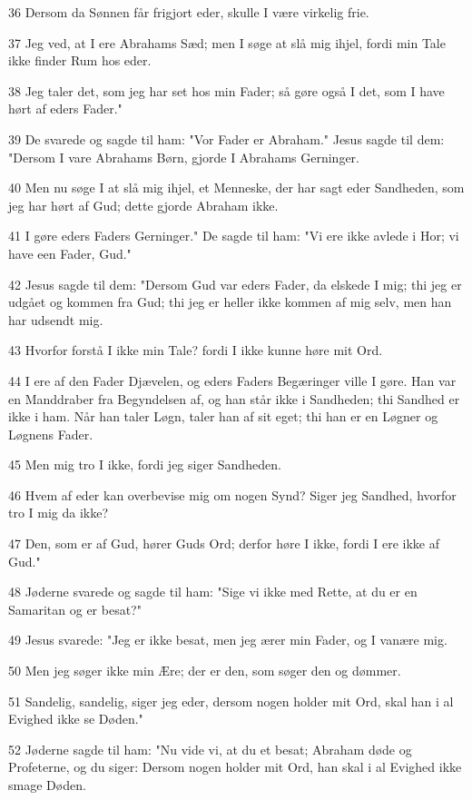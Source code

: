 \par 36 Dersom da Sønnen får frigjort eder, skulle I være virkelig frie.
\par 37 Jeg ved, at I ere Abrahams Sæd; men I søge at slå mig ihjel, fordi min Tale ikke finder Rum hos eder.
\par 38 Jeg taler det, som jeg har set hos min Fader; så gøre også I det, som I have hørt af eders Fader."
\par 39 De svarede og sagde til ham: "Vor Fader er Abraham." Jesus sagde til dem: "Dersom I vare Abrahams Børn, gjorde I Abrahams Gerninger.
\par 40 Men nu søge I at slå mig ihjel, et Menneske, der har sagt eder Sandheden, som jeg har hørt af Gud; dette gjorde Abraham ikke.
\par 41 I gøre eders Faders Gerninger." De sagde til ham: "Vi ere ikke avlede i Hor; vi have een Fader, Gud."
\par 42 Jesus sagde til dem: "Dersom Gud var eders Fader, da elskede I mig; thi jeg er udgået og kommen fra Gud; thi jeg er heller ikke kommen af mig selv, men han har udsendt mig.
\par 43 Hvorfor forstå I ikke min Tale? fordi I ikke kunne høre mit Ord.
\par 44 I ere af den Fader Djævelen, og eders Faders Begæringer ville I gøre. Han var en Manddraber fra Begyndelsen af, og han står ikke i Sandheden; thi Sandhed er ikke i ham. Når han taler Løgn, taler han af sit eget; thi han er en Løgner og Løgnens Fader.
\par 45 Men mig tro I ikke, fordi jeg siger Sandheden.
\par 46 Hvem af eder kan overbevise mig om nogen Synd? Siger jeg Sandhed, hvorfor tro I mig da ikke?
\par 47 Den, som er af Gud, hører Guds Ord; derfor høre I ikke, fordi I ere ikke af Gud."
\par 48 Jøderne svarede og sagde til ham: "Sige vi ikke med Rette, at du er en Samaritan og er besat?"
\par 49 Jesus svarede: "Jeg er ikke besat, men jeg ærer min Fader, og I vanære mig.
\par 50 Men jeg søger ikke min Ære; der er den, som søger den og dømmer.
\par 51 Sandelig, sandelig, siger jeg eder, dersom nogen holder mit Ord, skal han i al Evighed ikke se Døden."
\par 52 Jøderne sagde til ham: "Nu vide vi, at du et besat; Abraham døde og Profeterne, og du siger: Dersom nogen holder mit Ord, han skal i al Evighed ikke smage Døden.
